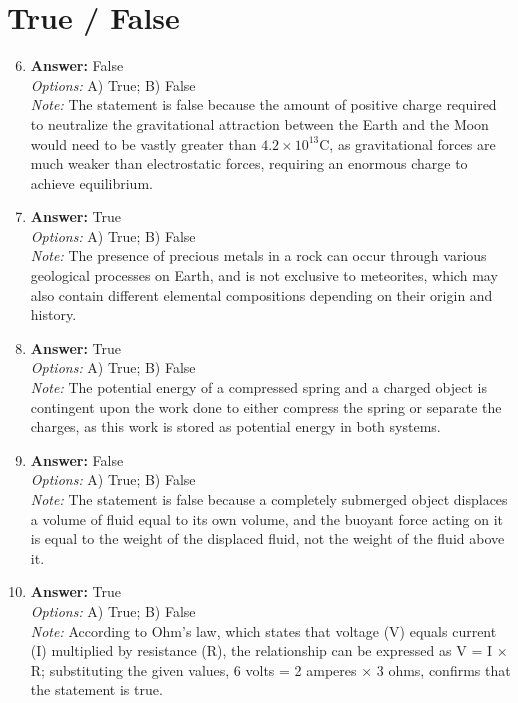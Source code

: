 \documentclass[12pt]{article}
\begin{document}
\section*{True / False}
\begin{enumerate}[label=\arabic*.]
\setcounter{enumi}{5}
\item \textbf{Answer:} False
\\ \textit{Options:} A) True; B) False
\\ \textit{Note:} The statement is false because the amount of positive charge required to neutralize the gravitational attraction between the Earth and the Moon would need to be vastly greater than $4.2 \times 10^{13} \mathrm{C}$, as gravitational forces are much weaker than electrostatic forces, requiring an enormous charge to achieve equilibrium.
\item \textbf{Answer:} True
\\ \textit{Options:} A) True; B) False
\\ \textit{Note:} The presence of precious metals in a rock can occur through various geological processes on Earth, and is not exclusive to meteorites, which may also contain different elemental compositions depending on their origin and history.
\item \textbf{Answer:} True
\\ \textit{Options:} A) True; B) False
\\ \textit{Note:} The potential energy of a compressed spring and a charged object is contingent upon the work done to either compress the spring or separate the charges, as this work is stored as potential energy in both systems.
\item \textbf{Answer:} False
\\ \textit{Options:} A) True; B) False
\\ \textit{Note:} The statement is false because a completely submerged object displaces a volume of fluid equal to its own volume, and the buoyant force acting on it is equal to the weight of the displaced fluid, not the weight of the fluid above it.
\item \textbf{Answer:} True
\\ \textit{Options:} A) True; B) False
\\ \textit{Note:} According to Ohm's law, which states that voltage (V) equals current (I) multiplied by resistance (R), the relationship can be expressed as V = I × R; substituting the given values, 6 volts = 2 amperes × 3 ohms, confirms that the statement is true.
\end{enumerate}
\end{document}
